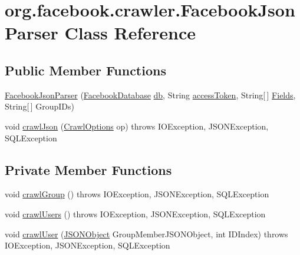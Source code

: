 \hypertarget{classorg_1_1facebook_1_1crawler_1_1_facebook_json_parser}{\section{org.\-facebook.\-crawler.\-Facebook\-Json\-Parser Class Reference}
\label{classorg_1_1facebook_1_1crawler_1_1_facebook_json_parser}
}
\subsection*{Public Member Functions}
\begin{DoxyCompactItemize}
\item 
\hyperlink{classorg_1_1facebook_1_1crawler_1_1_facebook_json_parser_ad4a53f8df38730092caf44c7ca5cba3a}{Facebook\-Json\-Parser} (\hyperlink{classorg_1_1facebook_1_1crawler_1_1_facebook_database}{Facebook\-Database} \hyperlink{classorg_1_1facebook_1_1crawler_1_1_facebook_json_parser_a0411f79e4986d72a4274a775d54ed42e}{db}, String \hyperlink{classorg_1_1facebook_1_1crawler_1_1_facebook_json_parser_a31fa96aed58c0b5ab6a156224d88cc19}{access\-Token}, String\mbox{[}$\,$\mbox{]} \hyperlink{classorg_1_1facebook_1_1crawler_1_1_facebook_json_parser_a5e950f9470c73a8ee7cfdafbe95ab100}{Fields}, String\mbox{[}$\,$\mbox{]} Group\-I\-Ds)
\item 
void \hyperlink{classorg_1_1facebook_1_1crawler_1_1_facebook_json_parser_a07aaa6f0ec99b77a81d6f0193b099bfa}{crawl\-Json} (\hyperlink{enumorg_1_1facebook_1_1crawler_1_1_crawl_options}{Crawl\-Options} op)  throws I\-O\-Exception, J\-S\-O\-N\-Exception, S\-Q\-L\-Exception 
\end{DoxyCompactItemize}
\subsection*{Private Member Functions}
\begin{DoxyCompactItemize}
\item 
void \hyperlink{classorg_1_1facebook_1_1crawler_1_1_facebook_json_parser_a91fc36b9636b126263163304e84565be}{crawl\-Group} ()  throws I\-O\-Exception, J\-S\-O\-N\-Exception, S\-Q\-L\-Exception 
\item 
void \hyperlink{classorg_1_1facebook_1_1crawler_1_1_facebook_json_parser_ac34111b952612f2142b68a3470e59087}{crawl\-Users} ()  throws I\-O\-Exception, J\-S\-O\-N\-Exception, S\-Q\-L\-Exception 
\item 
void \hyperlink{classorg_1_1facebook_1_1crawler_1_1_facebook_json_parser_a94c4a859c2d3abd9b7ed95121ae74998}{crawl\-User} (\hyperlink{classorg_1_1json_1_1_j_s_o_n_object}{J\-S\-O\-N\-Object} Group\-Member\-J\-S\-O\-N\-Object, int I\-D\-Index)  throws I\-O\-Exception, J\-S\-O\-N\-Exception, S\-Q\-L\-Exception 
\end{DoxyCompactItemize}
